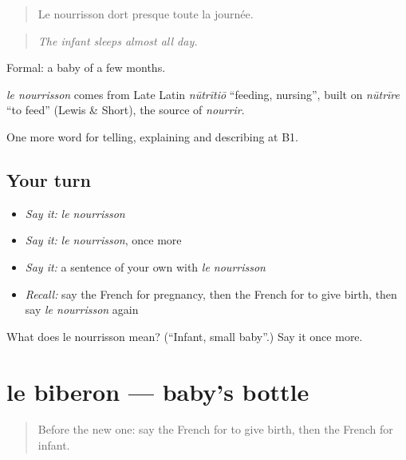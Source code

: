 \begin{quote}
Le nourrisson dort presque toute la journée.
\end{quote}

\begin{quote}
\emph{The infant sleeps almost all day.}
\end{quote}

Formal: a baby of a few months.

\begin{cousinweb}
\emph{le nourrisson} comes from Late Latin \emph{nūtrītiō} \textquotedblleft{}feeding, nursing\textquotedblright{}, built on \emph{nūtrīre} \textquotedblleft{}to feed\textquotedblright{} (Lewis \& Short), the source of \emph{nourrir}.
\end{cousinweb}

\begin{grammarlens}[title={What you've built}]
One more word for telling, explaining and describing at B1.
\end{grammarlens}

\subsection*{Your turn}
\begin{itemize}
\raggedright
  \item \emph{Say it:} \emph{le nourrisson}
  \item \emph{Say it:} \emph{le nourrisson}, once more
  \item \emph{Say it:} a sentence of your own with \emph{le nourrisson}
  \item \emph{Recall:} say the French for pregnancy, then the French for to give birth, then say \emph{le nourrisson} again
\end{itemize}

\begin{tcolorbox}[breakable,colback=teal!4,colframe=teal!35!black,title={Before you move on}]
What does le nourrisson mean? (\textquotedblleft{}Infant, small baby\textquotedblright{}.) Say it once more.
\end{tcolorbox}
\section[le biberon]{le biberon — baby's bottle}

\label{lesson:FR-C493-biberon}



\begin{quote}
Before the new one: say the French for to give birth, then the French for infant.
\end{quote}

